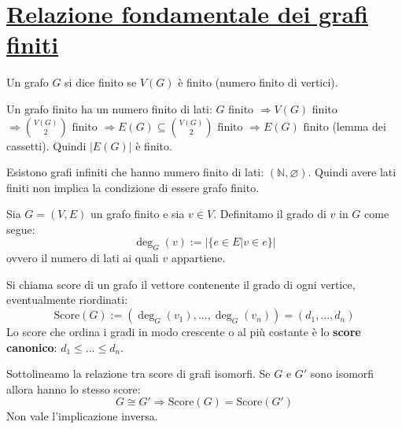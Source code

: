 \section{\underline{Relazione fondamentale dei grafi finiti}}
\begin{tcolorbox}[colback=yellow!30, colframe=yellow!30!black, title=Grafo finito]
Un grafo $G$ si dice finito se $V(G)$ è finito (numero finito di vertici).
\end{tcolorbox}

\begin{osservaz}
Un grafo finito ha un numero finito di lati:
$G$ finito $\Longrightarrow V(G)$ finito
$\Longrightarrow \binom{V(G)}{2} \text{ finito } \Longrightarrow E(G) \subseteq
\binom{V(G)}{2} \text{ finito } \Longrightarrow E(G) \text{ finito}$ (lemma dei cassetti).
Quindi $|E(G)|$ è finito.
\end{osservaz}

\begin{osservaz}
Esistono grafi infiniti che hanno numero finito di
lati: $(\mathbb{N}, \varnothing)$. Quindi avere lati finiti non implica la
condizione di essere grafo finito.
\end{osservaz}

\begin{tcolorbox}[colback=yellow!30, colframe=yellow!30!black, title=Grado di un vertice]
Sia $G=(V,E)$ un grafo finito e sia $v \in V$. Definitamo il grado di $v$
in $G$ come segue:
\[  \deg_G(v) := |\{e \in E| v \in e\}| \]
ovvero il numero di lati ai quali $v$ appartiene.
\end{tcolorbox}

\begin{tcolorbox}[colback=yellow!30, colframe=yellow!30!black, title=Score di un grafo]
Si chiama score di un grafo il vettore contenente il grado di ogni vertice,
eventualmente riordinati:
\[ \text{Score}(G) := (\deg_G(v_1),...,\deg_G(v_n)) = (d_1,...,d_n) \]
Lo score che ordina i gradi in modo crescente o al più costante è lo \textbf{score canonico}:
$d_1\leq ...\leq d_n$.
\end{tcolorbox}
Sottolineamo la relazione tra score di grafi isomorfi. Se $G$ e $G'$ sono isomorfi allora hanno lo stesso score:
\[ G \cong G' \Longrightarrow \text{Score}(G) = \text{Score}(G') \]
Non vale l'implicazione inversa.


